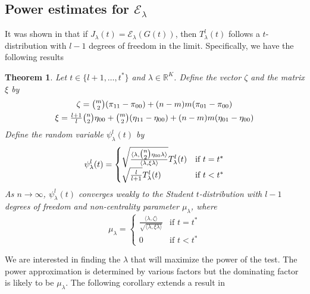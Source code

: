 \documentclass[final]{IEEEtran}
\newtheorem{theorem}{Theorem}
\theoremstyle{definition}
\begin{document}
\subsection{Power estimates for $\mathcal{E}_\lambda$}
\label{sec:power-estim-mathc}
It was shown in
\cite{lee:_laten_proces_model_time_attrib_random_graph} that if
$J_\lambda(t) = \mathcal{E}_{\lambda}(G(t))$, then $T_{\lambda}^{l}(t)$ 
follows a $t$-distribution with $l - 1$
degrees of freedom in the limit. Specifically, we have the following
results
\begin{theorem}
  \label{thm:9}
  Let $t \in \{l+1, \dots, t^{*}\}$ and $\lambda \in
  \mathbb{R}^{K}$. Define the vector $\zeta$ and the matrix $\xi$ by
  \begin{gather*}
    \zeta = \tbinom{m}{2}(\pi_{11} - \pi_{00}) + (n-m)m(\pi_{01} -
    \pi_{00}) \\
    \xi = \tfrac{l+1}{l}\tbinom{n}{2} \eta_{00} +
          \tbinom{m}{2}(\eta_{11} - \eta_{00}) + (n-m)m(\eta_{01} -
          \eta_{00})
  \end{gather*}
  Define the random variable $\psi^{l}_{\lambda}(t)$ by
  \begin{equation}
    \label{eq:10}
    \psi^{l}_{\lambda}(t) = \begin{cases}
      \sqrt{\frac{\langle \lambda, \tbinom{n}{2} \eta_{00}
            \lambda \rangle}{\langle \lambda, \xi
            \lambda \rangle}} T_{\lambda}^{l}(t) & \text{if $t = t^{*}$} \\
      \sqrt{\frac{l}{l + 1}} T_{\lambda}^{l}(t)& \text{if $t < t^{*}$}
      \end{cases}
  \end{equation}
As $n \rightarrow \infty$,
  $\psi^{l}_{\lambda}(t)$ converges weakly to the Student
  $t$-distribution with $l-1$ degrees of freedom and non-centrality
  parameter $\mu_{\lambda}$, where
  \begin{equation}
    \label{eq:15}
    \mu_{\lambda} = \begin{cases}
      \frac{\langle \lambda, \zeta \rangle}{\sqrt{\langle \lambda, \xi \lambda \rangle}} & \text{if $t = t^{*}$} \\
      0 & \text{if $t < t^{*}$}
    \end{cases}
  \end{equation}
\end{theorem}
We are interested in finding the $\lambda$ that will maximize the
power of the test. The power approximation is determined by various
factors but the dominating factor is likely to be
$\mu_{\lambda}$. The following corollary extends a result in
\end{document}
